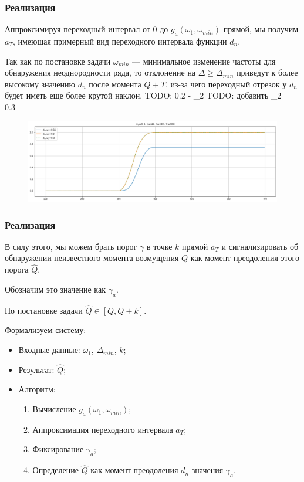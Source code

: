 \documentclass[11pt]{beamer}
\begin{document}
	\begin{frame}
		\frametitle{Реализация}
		Аппроксимируя переходный интервал от $ 0 $ до $ g_a(\omega_1, \omega_{min}) $ прямой, мы получим $ a_T $, имеющая примерный вид переходного интервала функции $ d_{n} $. 

		\bigskip

		Так как по постановке задачи $ \omega_{min} $ --- минимальное изменение частоты для обнаружения неоднородности ряда, то отклонение на $ \Delta \geq \Delta_{min} $ приведут к более высокому значению $ d_n $ после момента $ Q + T $, из-за чего переходный отрезок у $ d_{n} $ будет иметь еще более крутой наклон.
		TODO: 0.2 - \omega_2
		TODO: добавить \omega_2 = 0.3
		\begin{figure}[b]
			\centering
			\includegraphics[width=0.9\linewidth]{imgs/diff_omega_growth}
		\end{figure}
		
		
	\end{frame}
	
	\begin{frame}
		\frametitle{Реализация}
		В силу этого, мы можем брать порог $ \gamma $ в точке $ k $ прямой $ a_T $ и сигнализировать об обнаружении неизвестного момента возмущения $ Q $ как момент преодоления этого порога $ \hat{Q} $.
		
		Обозначим это значение как $ \gamma_a $. 
		
		По постановке задачи $ \hat{Q} \in [Q, Q+k] $.
		
		Формализуем систему:
		\begin{itemize}
			\item Входные данные: $\omega_1$, $\Delta_{min}$, $ k $;
			\item Результат: $\hat{Q}$;
			\item Алгоритм:
			\begin{enumerate}
				\item Вычисление $ g_a(\omega_1, \omega_{min}) $;
				\item Аппроксимация переходного интервала $ a_T $;
				\item Фиксирование $ \gamma_a $;
				\item Определение $ \hat{Q} $ как момент преодоления $ d_n $ значения $ \gamma_a $.
			\end{enumerate}	
		\end{itemize}		
		
		
	\end{frame}
\end{document}
